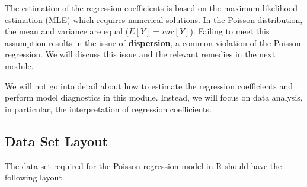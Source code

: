 \documentclass[
]{book}
\begin{document}
The estimation of the regression coefficients is based on the maximum likelihood estimation (MLE) which requires numerical solutions. In the Poisson distribution, the mean and variance are equal (\(E[Y] = var[Y]\)). Failing to meet this assumption results in the issue of \textbf{dispersion}, a common violation of the Poisson regression. We will discuss this issue and the relevant remedies in the next module.

We will not go into detail about how to estimate the regression coefficients and perform model diagnostics in this module. Instead, we will focus on data analysis, in particular, the interpretation of regression coefficients.

\hypertarget{data-set-layout}{%
\subsection{Data Set Layout}\label{data-set-layout}}

The data set required for the Poisson regression model in R should have the following layout.
\end{document}
